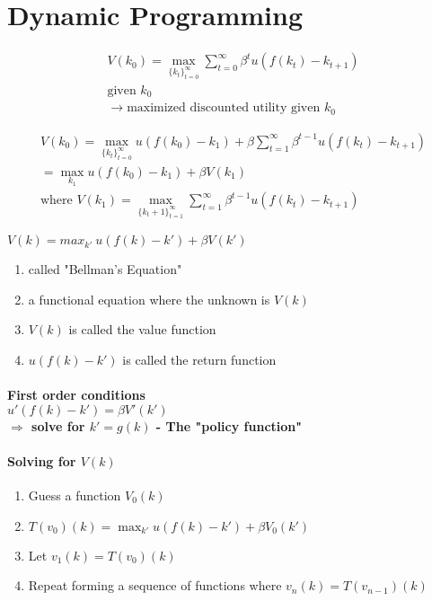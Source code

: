 \documentclass{article}
\begin{document}
\section{Dynamic Programming}

\[
    \begin{aligned}
        V(k_0) = \max_{\{k_t\}_{t=0}^\infty} \sum_{t=0}^\infty \beta^t u(f(k_t) - k_{t+1})\\
        \text{given } k_0 \\
        \rightarrow \text {maximized discounted utility given } k_0
    \end{aligned}
    \]

\[
    \begin{aligned}
        V(k_0) = \max_{\{k_t\}_{t=0}^\infty} u(f(k_0)-k_1) + \beta \sum_{t=1}^\infty \beta^{t-1} u(f(k_t) - k_{t+1})\\
        = \max_{k_1} u(f(k_0)-k_1) + \beta V(k_1)\\
        \text{where } V(k_1) = \max_{\{k_t+1\}_{t=1}^\infty} \sum_{t=1}^\infty \beta^{t-1} u(f(k_t) - k_{t+1})
    \end{aligned}
    \]

$V(k) = max_{k'}\ u(f(k) - k') + \beta V(k')$
\begin{enumerate}
    \item called "Bellman's Equation"
    \item a functional equation where the unknown is $V(k)$
    \item $V(k)$ is called the value function
    \item $u(f(k) - k')$ is called the return function
\end{enumerate}

\paragraph{First order conditions \\
$u'(f(k) - k') = \beta V'(k')$ \\
$\Rightarrow$ solve for $k' = g(k)$ - The "policy function"}

\paragraph{Solving for $V(k)$}
\begin {enumerate}
\item Guess a function $V_0(k)$
\item $T(v_0)(k) = \max_{k'} u(f(k) - k') + \beta V_0(k')$
\item Let $v_1(k) = T(v_0)(k)$
\item Repeat forming a sequence of functions where $v_n(k) = T(v_{n-1})(k)$
\end{enumerate}
\end{document}
